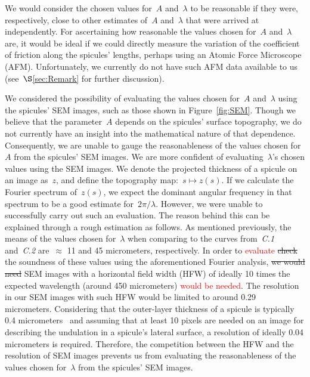 \documentclass[preprint,10pt,times]{elsarticle}
\numberwithin{equation}{section}
\begin{document}
We would consider the chosen values for~$A$ and~$\lambda$ to be
reasonable if they were, respectively, close to other estimates of~$A$
and~$\lambda$ that were arrived at independently. For ascertaining
how reasonable the values chosen for~$A$ and~$\lambda$ are, it
would be ideal if we could directly measure the variation of the coefficient
of friction along the spicules' lengths, perhaps using an Atomic Force
Microscope (AFM). Unfortunately, we currently do not have such AFM
data available to us (see~$\S$\ref{sec:Remark} for further discussion).

We considered the possibility of evaluating the values chosen for~$A$
and~$\lambda$ using the spicules' SEM images, such as those shown
in Figure~\ref{fig:SEM}. Though we believe that the parameter~$A$
depends on the spicules' surface topography, we do not currently have
an insight into the mathematical nature of that dependence. Consequently,
we are unable to gauge the reasonableness of the values chosen for~$A$
from the spicules' SEM images. We are more confident of evaluating~$\lambda$'s
chosen values using the SEM images. We denote the projected thickness
of a spicule on an image as~$z$, and define the topography map:~$s\mapsto z(s)$.
If we calculate the Fourier spectrum of~$z(s)$, we expect the dominant
angular frequency in that spectrum to be a good estimate for{~}$2\pi/\lambda$.
However, we were unable to successfully carry out such an evaluation.
The reason behind this can be explained through a rough estimation
as follows. As mentioned previously, the means of the values chosen
for~$\lambda$ when comparing to the curves from~\textit{C.1} and~\textit{C.2}
are{~}$\approx$ 11 and 45 micrometers, respectively.
In order to \textcolor{red}{evaluate} \sout{check} the soundness of these values using the aforementioned
Fourier analysis, \sout{we would need }SEM images with a horizontal field
width (HFW) of ideally 10 times the expected wavelength (around
450 micrometers) \textcolor{red}{would be needed}. The resolution in our SEM images with such HFW would
be limited to around 0.29 micrometers. Considering that the outer-layer
thickness of a spicule is typically 0.4 micrometers~\cite{monn2015new}
and assuming that at least 10 pixels are needed on an image for describing
the undulation in a spicule's lateral surface, a resolution of ideally
0.04 micrometers is required. Therefore, the competition between the
HFW and the resolution of SEM images prevents us from evaluating the
reasonableness of the values chosen for~$\lambda$ from the spicules'
SEM images.
\end{document}
